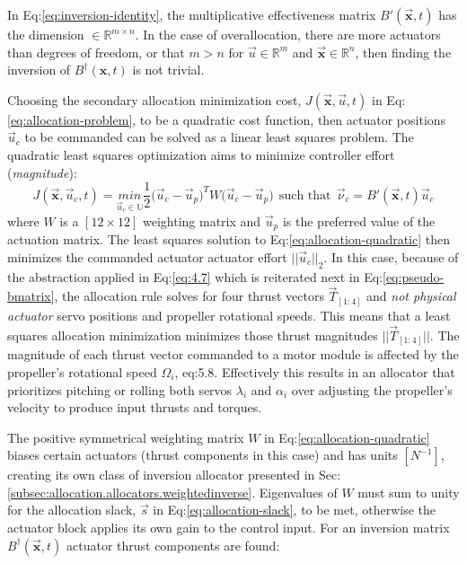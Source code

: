 In Eq:\ref{eq:inversion-identity}, the multiplicative effectiveness matrix $B'(\vec{\mathbf{x}},t)$ has the dimension $\in\mathbb{R}^{m\times n}$. In the case of overallocation, there are more actuators than degrees of freedom, or that $m>n$ for $\vec{u}\in\mathbb{R}^{m}$ and $\vec{\mathbf{x}}\in\mathbb{R}^{n}$, then finding the inversion of $B^\dagger(\mathbf{x},t)$ is not trivial. 
\par
Choosing the secondary allocation minimization cost, $J(\vec{\mathbf{x}},\vec{u},t)$ in Eq:\ref{eq:allocation-problem}, to be a quadratic cost function, then actuator positions $\vec{u}_c$ to be commanded can be solved as a linear least squares problem. The quadratic least squares optimization aims to minimize controller effort (\emph{magnitude}):
\begin{equation}\label{eq:allocation-quadratic}
J(\vec{\mathbf{x}},\vec{u}_c,t)=\underset{\vec{u}_c\in\mathbb{U}}{min}\frac{1}{2}\big(\vec{u}_c-\vec{u}_p\big)^TW\big(\vec{u}_c-\vec{u}_p)~~\text{such that}~~\vec{\nu}_c=B'(\vec{\mathbf{x}},t)\vec{u}_c
\end{equation}
where $W$ is a $[12\times 12]$ weighting matrix and $\vec{u}_p$ is the preferred value of the actuation matrix. The least squares solution \cite{matrixcomputations} to Eq:\ref{eq:allocation-quadratic} then minimizes the commanded actuator actuator effort $||\vec{u}_c||_2$. In this case, because of the abstraction applied in Eq:\ref{eq:4.7} which is reiterated next in Eq:\ref{eq:pseudo-bmatrix}, the allocation rule solves for four thrust vectors $\vec{T}_{[1:4]}$ and \emph{not physical actuator} servo positions and propeller rotational speeds. This means that a least squares allocation minimization minimizes those thrust magnitudes $||\vec{T}_{[1:4]}||$. The magnitude of each thrust vector commanded to a motor module is affected by the propeller's rotational speed $\Omega_i$, {eq:5.8}. Effectively this results in an allocator that prioritizes pitching or rolling both servos $\lambda_i$ and $\alpha_i$ over adjusting the propeller's velocity to produce input thrusts and torques. 
\par
The positive symmetrical weighting matrix $W$ in Eq:\ref{eq:allocation-quadratic} biases certain actuators (thrust components in this case) and has units $[N^{-1}]$, creating its own class of inversion allocator presented in Sec:\ref{subsec:allocation.allocators.weightedinverse}. Eigenvalues of $W$ must sum to unity for the allocation slack, $\vec{s}$ in Eq:\ref{eq:allocation-slack}, to be met, otherwise the actuator block applies its own gain to the control input. For an inversion matrix $B^\dagger(\vec{\mathbf{x}},t)$ actuator thrust components are found:
